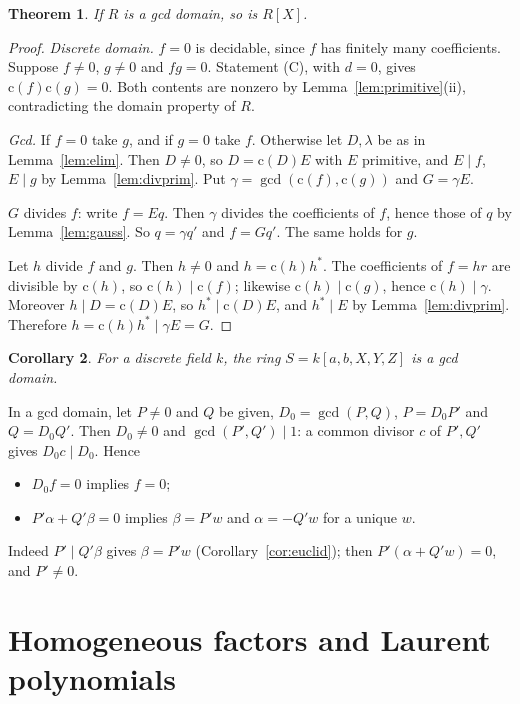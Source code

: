 \documentclass[11pt]{amsart}
\newtheorem{theorem}{Theorem}[section]
\newtheorem{corollary}[theorem]{Corollary}
\theoremstyle{definition}
\theoremstyle{remark}
\newcommand{\gcdop}{\operatorname{gcd}}
\newcommand{\cont}{\mathrm c}
\begin{document}
\begin{theorem}\label{thm:gcd}
If $R$ is a gcd domain, so is $R[X]$.
\end{theorem}
\begin{proof}
\emph{Discrete domain.} $f=0$ is decidable, since $f$ has finitely many
coefficients. Suppose $f\ne0$, $g\ne0$ and $fg=0$. Statement (C), with
$d=0$, gives $\cont(f)\cont(g)=0$. Both contents are nonzero by
Lemma~\ref{lem:primitive}(ii), contradicting the domain property of $R$.

\emph{Gcd.} If $f=0$ take $g$, and if $g=0$ take $f$. Otherwise let
$D,\lambda$ be as in Lemma~\ref{lem:elim}. Then $D\ne0$, so
$D=\cont(D)E$ with $E$ primitive, and $E\mid f$, $E\mid g$ by
Lemma~\ref{lem:divprim}. Put $\gamma=\gcdop(\cont(f),\cont(g))$ and
$G=\gamma E$.

$G$ divides $f$: write $f=Eq$. Then $\gamma$ divides the coefficients of
$f$, hence those of $q$ by Lemma~\ref{lem:gauss}. So $q=\gamma q'$ and
$f=Gq'$. The same holds for $g$.

Let $h$ divide $f$ and $g$. Then $h\ne0$ and $h=\cont(h)h^*$. The
coefficients of $f=hr$ are divisible by $\cont(h)$, so
$\cont(h)\mid\cont(f)$; likewise $\cont(h)\mid\cont(g)$, hence
$\cont(h)\mid\gamma$. Moreover $h\mid D=\cont(D)E$, so $h^*\mid\cont(D)E$,
and $h^*\mid E$ by Lemma~\ref{lem:divprim}. Therefore
$h=\cont(h)h^*\mid\gamma E=G$.
\end{proof}

\begin{corollary}\label{cor:S}
For a discrete field $k$, the ring $S=k[a,b,X,Y,Z]$ is a gcd domain.
\end{corollary}

In a gcd domain, let $P\ne0$ and $Q$ be given, $D_0=\gcdop(P,Q)$,
$P=D_0P'$ and $Q=D_0Q'$. Then $D_0\ne0$ and $\gcdop(P',Q')\mid1$: a common
divisor $c$ of $P',Q'$ gives $D_0c\mid D_0$. Hence
\begin{itemize}
\item[(S0)] $D_0f=0$ implies $f=0$;
\item[(S1)] $P'\alpha+Q'\beta=0$ implies $\beta=P'w$ and $\alpha=-Q'w$ for a
  unique $w$.
\end{itemize}
Indeed $P'\mid Q'\beta$ gives $\beta=P'w$ (Corollary~\ref{cor:euclid}); then
$P'(\alpha+Q'w)=0$, and $P'\ne0$.

\section{Homogeneous factors and Laurent polynomials}\label{sec:laurent}
\end{document}
